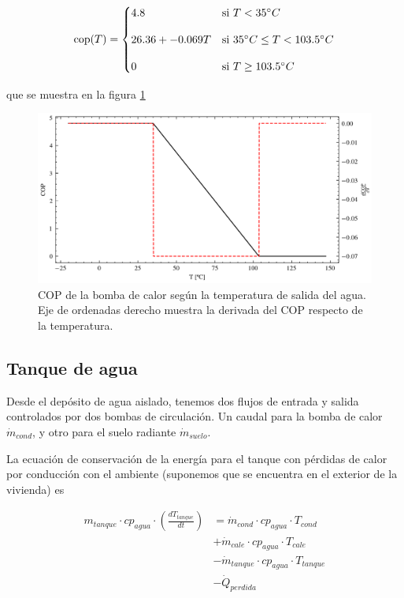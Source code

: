 \begin{equation}
	\text{\text{cop}}(T) =
	\begin{cases}
		4.8              & \text{si } T < 35^\circ C                    \\[10pt]
		26.36 + -0.069 T & \text{si } 35^\circ C \leq T < 103.5^\circ C \\[10pt]
		0                & \text{si } T \geq 103.5^\circ C
	\end{cases}
\end{equation}

que se muestra en la figura \ref{fig:heat_pump_cop}

\begin{figure}[h] \centering
	\centering
	\includegraphics[width=1\textwidth]{./capitulos/resultados_discusion/images/heat_pump_cop.png}
	\caption{COP de la bomba de calor según la temperatura de salida del agua.
		Eje de ordenadas derecho muestra la derivada del COP respecto de la
		temperatura.}
	\label{fig:heat_pump_cop}
\end{figure}


\subsection{Tanque de agua}

Desde el depósito de agua aislado, tenemos dos flujos de entrada y salida
controlados por dos bombas de circulación. Un caudal para la bomba de calor
$\dot{m}_{cond}$, y otro para el suelo radiante $\dot{m}_{suelo}$.

La ecuación de conservación de la energía para el tanque con pérdidas de calor
por conducción con el ambiente (suponemos que se encuentra en el exterior de la
vivienda) es

\begin{align} \label{eq:t_tanque_balance}
	m_{tanque} \cdot cp_{agua} \cdot \left( \frac{dT_{tanque}}{dt} \right) & = \dot{m}_{cond} \cdot cp_{agua} \cdot T_{cond} \nonumber     \\
	                                                                       & + \dot{m}_{cale} \cdot cp_{agua} \cdot T_{cale} \nonumber     \\
	                                                                       & - \dot{m}_{tanque} \cdot cp_{agua} \cdot T_{tanque} \nonumber \\
	                                                                       & - \dot{Q}_{perdida}
\end{align}

